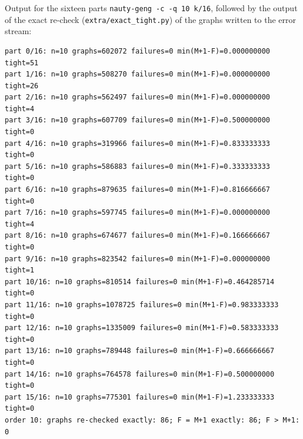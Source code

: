 \documentclass[11pt,a4paper]{article}
\theoremstyle{definition}
\theoremstyle{remark}
\numberwithin{equation}{section}
\begin{document}
Output for the sixteen parts \texttt{nauty-geng -c -q 10 k/16}, followed by the output of the exact re-check (\texttt{extra/exact\_tight.py}) of the graphs written to the error stream:
\begin{lstlisting}
part 0/16: n=10 graphs=602072 failures=0 min(M+1-F)=0.000000000 tight=51
part 1/16: n=10 graphs=508270 failures=0 min(M+1-F)=0.000000000 tight=26
part 2/16: n=10 graphs=562497 failures=0 min(M+1-F)=0.000000000 tight=4
part 3/16: n=10 graphs=607709 failures=0 min(M+1-F)=0.500000000 tight=0
part 4/16: n=10 graphs=319966 failures=0 min(M+1-F)=0.833333333 tight=0
part 5/16: n=10 graphs=586883 failures=0 min(M+1-F)=0.333333333 tight=0
part 6/16: n=10 graphs=879635 failures=0 min(M+1-F)=0.816666667 tight=0
part 7/16: n=10 graphs=597745 failures=0 min(M+1-F)=0.000000000 tight=4
part 8/16: n=10 graphs=674677 failures=0 min(M+1-F)=0.166666667 tight=0
part 9/16: n=10 graphs=823542 failures=0 min(M+1-F)=0.000000000 tight=1
part 10/16: n=10 graphs=810514 failures=0 min(M+1-F)=0.464285714 tight=0
part 11/16: n=10 graphs=1078725 failures=0 min(M+1-F)=0.983333333 tight=0
part 12/16: n=10 graphs=1335009 failures=0 min(M+1-F)=0.583333333 tight=0
part 13/16: n=10 graphs=789448 failures=0 min(M+1-F)=0.666666667 tight=0
part 14/16: n=10 graphs=764578 failures=0 min(M+1-F)=0.500000000 tight=0
part 15/16: n=10 graphs=775301 failures=0 min(M+1-F)=1.233333333 tight=0
order 10: graphs re-checked exactly: 86; F = M+1 exactly: 86; F > M+1: 0
\end{lstlisting}
\end{document}
